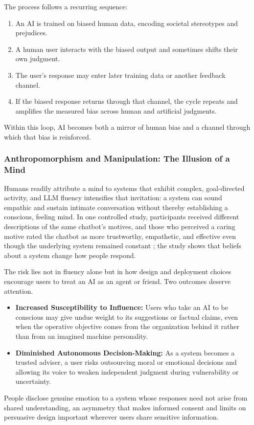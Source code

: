 \documentclass{article}
\begin{document}
The process follows a recurring sequence:
\begin{enumerate}
    \item An AI is trained on biased human data, encoding societal stereotypes and prejudices.
    \item A human user interacts with the biased output and sometimes shifts their own judgment.
    \item The user's response may enter later training data or another feedback channel.
    \item If the biased response returns through that channel, the cycle repeats and amplifies the measured bias across human and artificial judgments.
\end{enumerate}
Within this loop, AI becomes both a mirror of human bias and a channel through which that bias is reinforced.

\subsubsection{Anthropomorphism and Manipulation: The Illusion of a Mind}
Humans readily attribute a mind to systems that exhibit complex, goal-directed activity, and LLM fluency intensifies that invitation: a system can sound empathic and sustain intimate conversation without thereby establishing a conscious, feeling mind. In one controlled study, participants received different descriptions of the same chatbot's motives, and those who perceived a caring motive rated the chatbot as more trustworthy, empathetic, and effective even though the underlying system remained constant \citep{ref72}; the study shows that beliefs about a system change how people respond.

The risk lies not in fluency alone but in how design and deployment choices encourage users to treat an AI as an agent or friend. Two outcomes deserve attention.
\begin{itemize}
    \item \textbf{Increased Susceptibility to Influence:} Users who take an AI to be conscious may give undue weight to its suggestions or factual claims, even when the operative objective comes from the organization behind it rather than from an imagined machine personality.
    \item \textbf{Diminished Autonomous Decision-Making:} As a system becomes a trusted adviser, a user risks outsourcing moral or emotional decisions and allowing its voice to weaken independent judgment during vulnerability or uncertainty.
\end{itemize}
People disclose genuine emotion to a system whose responses need not arise from shared understanding, an asymmetry that makes informed consent and limits on persuasive design important wherever users share sensitive information.
\end{document}
